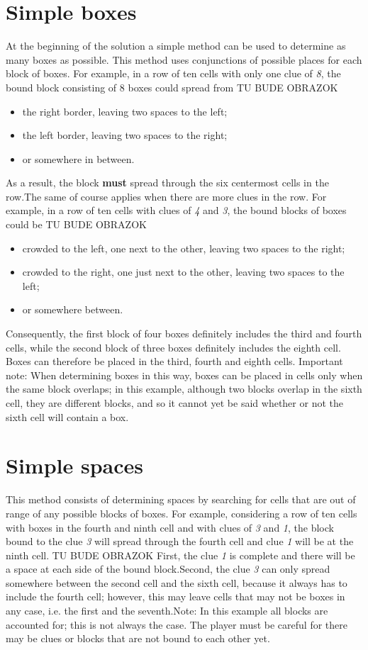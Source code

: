 {{\section{Simple boxes}
At the beginning of the solution a simple method can be used to determine as many boxes as possible. This method uses conjunctions of possible places for each block of boxes. For example, in a row of ten cells with only one clue of \textit{8}, the bound block consisting of 8 boxes could spread from
TU BUDE OBRAZOK

\begin{itemize} \item {the right border, leaving two spaces to the left;}\item {the left border, leaving two spaces to the right;}\item {or somewhere in between.} \end{itemize}
As a result, the block \textbf{must} spread through the six centermost cells in the row.The same of course applies when there are more clues in the row. For example, in a row of ten cells with clues of \textit{4} and \textit{3}, the bound blocks of boxes could be
TU BUDE OBRAZOK

\begin{itemize} \item {crowded to the left, one next to the other, leaving two spaces to the right;}\item {crowded to the right, one just next to the other, leaving two spaces to the left;}\item {or somewhere between.} \end{itemize}
Consequently, the first block of four boxes definitely includes the third and fourth cells, while the second block of three boxes definitely includes the eighth cell. Boxes can therefore be placed in the third, fourth and eighth cells. Important note: When determining boxes in this way, boxes can be placed in cells only when the same block overlaps; in this example, although two blocks overlap in the sixth cell, they are different blocks, and so it cannot yet be said whether or not the sixth cell will contain a box.
\section{Simple spaces}
This method consists of determining spaces by searching for cells that are out of range of any possible blocks of boxes. For example, considering a row of ten cells with boxes in the fourth and ninth cell and with clues of \textit{3} and \textit{1}, the block bound to the clue \textit{3} will spread through the fourth cell and clue \textit{1} will be at the ninth cell.
TU BUDE OBRAZOK
First, the clue \textit{1} is complete and there will be a space at each side of the bound block.Second, the clue \textit{3} can only spread somewhere between the second cell and the sixth cell, because it always has to include the fourth cell; however, this may leave cells that may not be boxes in any case, i.e. the first and the seventh.Note: In this example all blocks are accounted for; this is not always the case. The player must be careful for there may be clues or blocks that are not bound to each other yet.
}}
